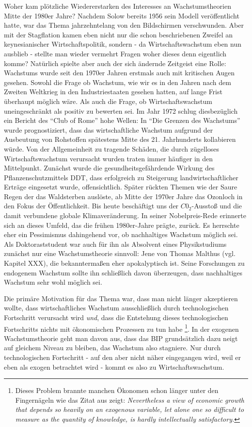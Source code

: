 Woher kam plötzliche Wiedererstarken des Interesses an Wachstumstheorien Mitte der 1980er Jahre? Nachdem Solow bereits 1956 sein Modell veröffentlicht hatte, war das Thema jahrzehntelang von den Bildschirmen verschwunden. Aber mit der Stagflation kamen eben nicht nur die schon beschriebenen Zweifel an keynesianischer Wirtschaftspolitik, sondern - da Wirtschaftswachstum eben nun ausblieb - stellte man wieder vermehrt Fragen woher dieses denn eigentlich komme? 
Natürlich spielte aber auch der sich ändernde Zeitgeist eine Rolle: Wachstums wurde seit den 1970er Jahren erstmals auch mit kritischen Augen gesehen. Sowohl die Frage ob Wachstum, wie wir es in den Jahren nach dem Zweiten Weltkrieg in den Industriestaaten gesehen hatten, auf lange Frist überhaupt möglich wäre. Als auch die Frage, ob Wirtschaftswachstum uneingeschränkt als positiv zu bewerten sei. Im Jahr 1972 schlug diesbezüglich ein Bericht des "`Club of Rome"' hohe Wellen: In "`Die Grenzen des Wachstums"' wurde prognostiziert, dass das wirtschaftliche Wachstum aufgrund der Ausbeutung von Rohstoffen spätestens Mitte des 21. Jahrhunderts kollabieren würde. Von der Allgemeinheit zu tragende Schäden, die durch zügelloses Wirtschaftswachstum verursacht wurden traten immer häufiger in den Mittelpunkt. Zunächst wurde die gesundheitsgefährdende Wirkung des Pflanzenschutzmittels DDT, dass erfolgreich zu Steigerung landwirtschaftlicher Erträge eingesetzt wurde, offensichtlich. Später rückten Themen wie der Saure Regen der das Waldsterben auslöste, ab Mitte der 1970er Jahre das Ozonloch in den Fokus der Öffentlichkeit. Bis heute beschäftigt uns der $C0_2$-Ausstoß und die damit verbundene globale Klimaveränderung.
In seiner Nobelpreis-Rede erinnerte sich \textcite{Romer2018} an dieses Umfeld, das die frühen 1980er-Jahre prägte, zurück. Es herrschte eher ein Pessimismus dahingehend vor, ob nachhaltiges Wachstum möglich sei. Als Doktoraststudent war auch für ihn als Absolvent eines Physikstudiums zunächst nur eine Wachstumstheorie sinnvoll: Jene von Thomas Malthus (vgl. Kapitel XXX), die bekanntermaßen eher apokalyptisch ist\parencite{Romer1986}. Seine Forschungen zu endogenem Wachstum sollte ihn schließlich davon überzeugen, dass nachhaltiges Wachstum sehr wohl möglich sei.

Die primäre Motivation für das Thema war, dass man nicht länger akzeptieren wollte, dass wirtschaftliches Wachstum ausschließlich durch technologischen Fortschritt verursacht wird \textit{und}, dass die Entstehung dieses technologischen Fortschritts nichts mit ökonomischen Prozessen zu tun habe \footnote{Dieses Problem brannte manchen Ökonomen schon länger unter den Fingernägeln wie das Zitat aus \textcite{Arrow1962} zeigt: \textit{Nevertheless a view of economic growth that depends so heavily on an exogenous variable, let alone one so difficult to measure as the quantity of knowledge, is hardly intellectually satisfactory.}}. In der exogenen Wachstumstheorie geht man davon aus, dass das BIP grundsätzlich dazu neigt auf gleichem Niveau zu bleiben, das Wachstum also stagniere. Nur durch technologischen Fortschritt - auf den aber nicht näher eingegangen wird, weil er eben als exogen betrachtet wird - kommt es also zu Wirtschaftswachstum.

